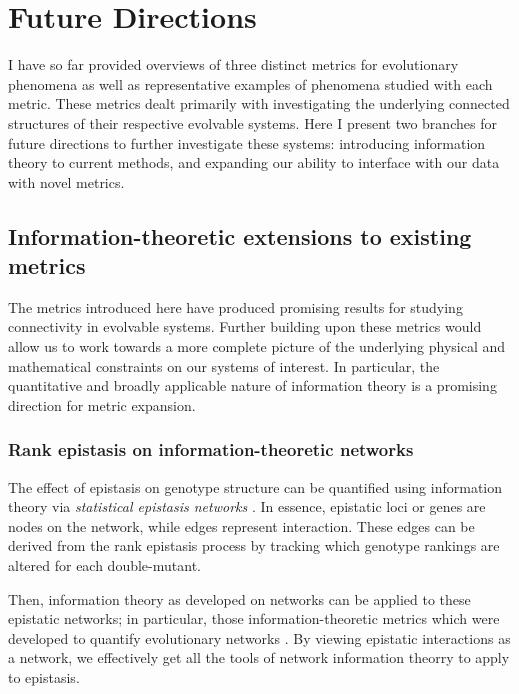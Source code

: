\section{Future Directions}

I have so far provided overviews of three distinct metrics for evolutionary phenomena as well as representative examples of phenomena studied with each metric. These metrics dealt primarily with investigating the underlying connected structures of their respective evolvable systems. Here I present two branches for future directions to further investigate these systems: introducing information theory to current methods, and expanding our ability to interface with our data with novel metrics.

\subsection{Information-theoretic extensions to existing metrics}

The metrics introduced here have produced promising results for studying connectivity in evolvable systems. Further building upon these metrics would allow us to work towards a more complete picture of the underlying physical and mathematical constraints on our systems of interest. In particular, the quantitative and broadly applicable nature of information theory is a promising direction for metric expansion.


\subsubsection{Rank epistasis on information-theoretic networks}

The effect of epistasis on genotype structure can be quantified using information theory via \textit{statistical epistasis networks} \citep{moore_flexible_2006, mckinney_six_2012}.
In essence, epistatic loci or genes are nodes on the network, while edges represent interaction. 
These edges can be derived from the rank epistasis process by tracking which genotype rankings are altered for each double-mutant. 

Then, information theory as developed on networks can be applied to these epistatic networks; in particular, those information-theoretic metrics which were developed to quantify evolutionary networks \citep{sole_information_2004, adami_information_2011, carpi_analyzing_2011}. By viewing epistatic interactions as a network, we effectively get all the tools of network information theorry to apply to epistasis.

